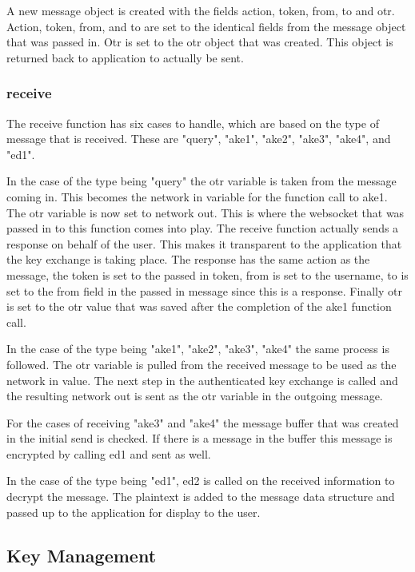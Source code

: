 A new message object is created with the fields action, token, from, to and otr. Action, token, from, and to are set to the identical fields from the message object that was passed in. Otr is set to the otr object that was created. This object is returned back to application to actually be sent.


\subsubsection{receive}


The receive function has six cases to handle, which are based on the type of message that is received. These are "query", "ake1", "ake2", "ake3", "ake4", and "ed1".


In the case of the type being "query" the otr variable is taken from the message coming in. This becomes the network in variable for the function call to ake1. The otr variable is now set to network out. This is where the websocket that was passed in to this function comes into play. The receive function actually sends a response on behalf of the user. This makes it transparent to the application that the key exchange is taking place. The response has the same action as the message, the token is set to the passed in token, from is set to the username, to is set to the from field in the passed in message since this is a response. Finally otr is set to the otr value that was saved after the completion of the ake1 function call.


In the case of the type being "ake1", "ake2", "ake3", "ake4" the same process is followed. The otr variable is pulled from the received message to be used as the network in value. The next step in the authenticated key exchange is called and the resulting network out is sent as the otr variable in the outgoing message.


For the cases of receiving "ake3" and "ake4" the message buffer that was created in the initial send is checked. If there is a message in the buffer this message is encrypted by calling ed1 and sent as well. 


In the case of the type being "ed1", ed2 is called on the received information to decrypt the message. The plaintext is added to the message data structure and passed up to the application for display to the user.


\subsection{Key Management}


